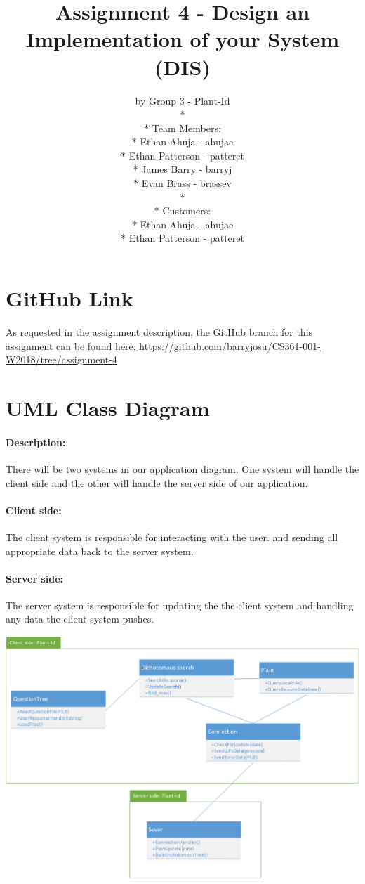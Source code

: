 \documentclass[a4paper]{article}
\title{Assignment 4 - Design an Implementation of your System (DIS)}
\author{ by Group 3 - Plant-Id \\* \\* Team Members: \\* Ethan Ahuja - ahujae \\* Ethan Patterson - patteret \\* James Barry - barryj \\* Evan Brass - brassev \\* \\* Customers: \\* Ethan Ahuja - ahujae \\* Ethan Patterson - patteret}
\begin{document}
\maketitle
\pagebreak
\tableofcontents
\pagebreak
\section{GitHub Link}
As requested in the assignment description, the GitHub branch for this assignment can be found here: \url{https://github.com/barryjosu/CS361-001-W2018/tree/assignment-4}
\section{UML Class Diagram}
\paragraph{Description:}
There will be two systems in our application diagram. One system will handle the client side and the other will handle the server side of our application.
\paragraph{Client side:}
The client system is responsible for interacting with the user. and sending all appropriate data back to the server system.
\paragraph{Server side:}
The server system is responsible for updating the the client system and handling any data the client system pushes.
\begin{center}\includegraphics[scale=.7]{UML.eps}\end{center}
\pagebreak
\end{document}
